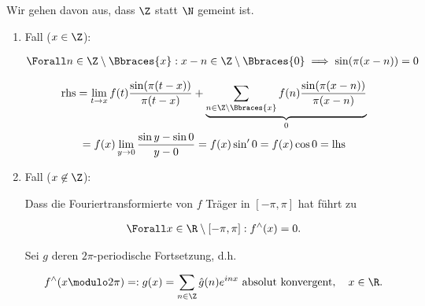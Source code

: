 \begin{solution}

Wir gehen davon aus, dass $\Z$ statt $\N$ gemeint ist.

\begin{enumerate}[label = \arabic*.]

    \item Fall ($x \in \Z$):
    
    \begin{align*}
        \Forall n \in \Z \setminus \Bbraces{x}:
        x - n \in \Z \setminus \Bbraces{0}
        \implies
        \sin(\pi (x - n)) = 0
    \end{align*}
    
    \begin{multline*}
        \mathrm{rhs}
        =
        \lim_{t \to x}
        f(t)
        \frac
        {
            \sin(\pi (t - x))
        }{
            \pi (t - x)
        }
        +
        \underbrace
        {
            \sum_{n \in \Z \setminus \Bbraces{x}}
            f(n)
            \frac
            {
                \sin(\pi (x - n))
            }{
                \pi (x - n)
            }
        }_0 \\
        =
        f(x)
        \lim_{y \to 0}
        \frac{\sin y - \sin 0}{y - 0}
        =
        f(x)
        \sin^\prime 0
        =
        f(x)
        \cos 0
        =
        \mathrm{lhs}
    \end{multline*}

    \item Fall ($x \not \in \Z$):
    
    Dass die Fouriertransformierte von $f$ Träger in $[-\pi, \pi]$ hat führt zu

    \begin{align*}
        \Forall x \in \R \setminus [-\pi, \pi]:
        f^\wedge(x) = 0.
    \end{align*}

    Sei $g$ deren $2 \pi$-periodische Fortsetzung, d.h.

    \begin{align*}
        f^\wedge(x \modulo 2 \pi)
        =:
        g(x)
        =
        \sum_{n \in \Z}
        \hat g(n)
        e^{i n x}
        ~\text{absolut konvergent},
        \quad
        x \in \R.
    \end{align*}


\end{enumerate}
\end{solution}
